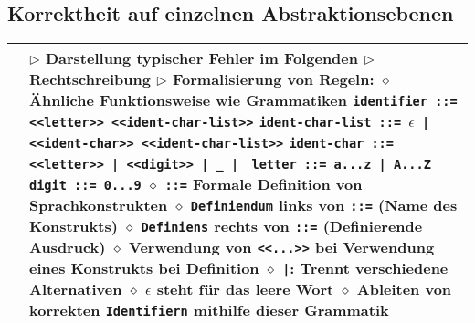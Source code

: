 \subsection*{Korrektheit auf einzelnen Abstraktionsebenen}

	\begin{longtable}{ | p{} p{} | } 
	\hline 
	
	\makecell[l]{Lexikalische Ebene} & \makecell[l]{
	$\rhd$ Darstellung typischer Fehler im Folgenden \\
	$\rhd$ Rechtschreibung \\
	$\rhd$ Formalisierung von Regeln: \\
	\hspace{0.4cm} $\diamond$ Ähnliche Funktionsweise wie Grammatiken \\
	\hspace{0.6cm} \texttt{identifier ::= <<letter>> <<ident-char-list>>} \\
	\hspace{0.6cm} \texttt{ident-char-list ::= $\epsilon$ | <<ident-char>> <<ident-char-list>>} \\ 
	\hspace{0.6cm} \texttt{ident-char ::= <<letter>> | <<digit>> | \_ | \textdollar} \\
	\hspace{0.6cm} \texttt{letter ::= a...z | A...Z} \\
	\hspace{0.6cm} \texttt{digit ::= 0...9} \\
	\hspace{0.4cm} $\diamond$ \texttt{::=} Formale Definition von Sprachkonstrukten \\
	\hspace{0.4cm} $\diamond$ \texttt{Definiendum} links von \texttt{::=} (Name des Konstrukts) \\
	\hspace{0.4cm} $\diamond$ \texttt{Definiens} rechts von \texttt{::=} (Definierende Ausdruck) \\
	\hspace{0.4cm} $\diamond$ Verwendung von \texttt{<<...>>} bei Verwendung eines Konstrukts bei Definition \\
	\hspace{0.4cm} $\diamond$ \texttt{|}: Trennt verschiedene Alternativen \\ 
	\hspace{0.4cm} $\diamond$ $\epsilon$ steht für das leere Wort \\
	\hspace{0.4cm} $\diamond$ Ableiten von korrekten \texttt{Identifiern} mithilfe dieser Grammatik}  \\ \hline
	

\end{longtable}
